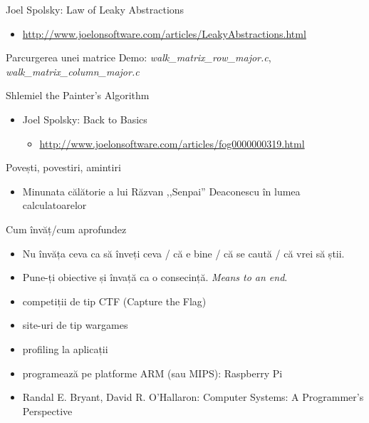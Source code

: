 \documentclass{simple}
\begin{document}
\begin{frame}{Joel Spolsky: Law of Leaky Abstractions}
  \begin{itemize}
    \item \footnotesize{\url{http://www.joelonsoftware.com/articles/LeakyAbstractions.html}}
  \end{itemize}
\end{frame}

\begin{frame}{Parcurgerea unei matrice}
  \centering
  Demo: \textit{walk\_matrix\_row\_major.c}, \textit{walk\_matrix\_column\_major.c}
\end{frame}

\begin{frame}{Shlemiel the Painter's Algorithm}
  \begin{itemize}
    \item Joel Spolsky: Back to Basics
      \begin{itemize}
        \item \footnotesize{\url{http://www.joelonsoftware.com/articles/fog0000000319.html}}
      \end{itemize}
  \end{itemize}
\end{frame}

\begin{frame}{Povești, povestiri, amintiri}
  \begin{itemize}
    \item Minunata călătorie a lui Răzvan ,,Senpai'' Deaconescu în lumea calculatoarelor
  \end{itemize}
\end{frame}

\begin{frame}{Cum învăț/cum aprofundez}
  \begin{itemize}
    \pause \item Nu învăța ceva ca să înveți ceva / că e bine / că se caută / că vrei să știi.
    \pause \item Pune-ți obiective și învață ca o consecință. \textit{Means to an end}.
    \pause \item competiții de tip CTF (Capture the Flag)
    \pause \item site-uri de tip wargames
    \pause \item profiling la aplicații
    \pause \item programează pe platforme ARM (sau MIPS): Raspberry Pi
    \pause \item Randal E. Bryant, David R. O'Hallaron: Computer Systems: A Programmer's Perspective
  \end{itemize}
\end{frame}
\end{document}
